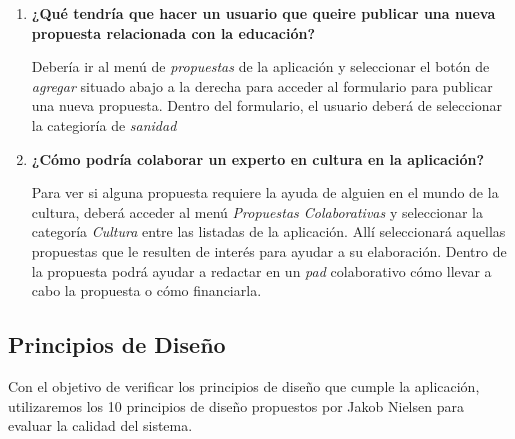 \begin{enumerate}[label=\textbf{\Alph*}]
 \item \textbf{¿Qué tendría que hacer un usuario que queire publicar una nueva propuesta relacionada con la educación?}
 
 Debería ir al menú de \textit{propuestas} de la aplicación y seleccionar el botón de \textit{agregar} situado abajo a la derecha para acceder al formulario para publicar una nueva propuesta. Dentro del formulario, el usuario deberá de seleccionar la categioría de \textit{sanidad}
 
 \item \textbf{¿Cómo podría colaborar un experto en cultura en la aplicación?}
 
 Para ver si alguna propuesta requiere la ayuda de alguien en el mundo de la cultura, deberá acceder al menú \textit{Propuestas Colaborativas} y seleccionar la categoría \textit{Cultura} entre las listadas de la aplicación. Allí seleccionará aquellas propuestas que le resulten de interés para ayudar a su elaboración. Dentro de la propuesta podrá ayudar a redactar en un \textit{pad} colaborativo cómo llevar a cabo la propuesta o cómo financiarla.
 
\end{enumerate}

\subsection{Principios de Diseño}

Con el objetivo de verificar los principios de diseño que cumple la aplicación, utilizaremos los 10 principios de diseño propuestos por Jakob Nielsen \cite{ref:nielsen} para evaluar la calidad del sistema.

